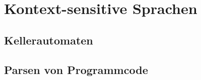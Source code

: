 \chapter{Kontext-sensitive Sprachen}\label{keller}
\section{Kellerautomaten}
\section{Parsen von Programmcode}
